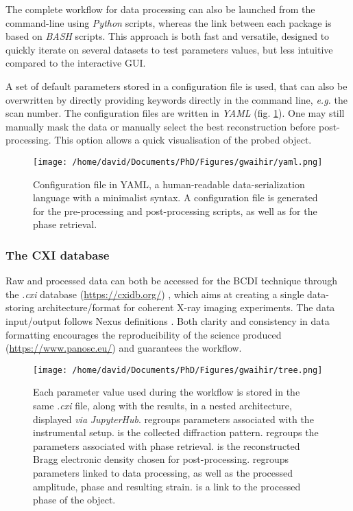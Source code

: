 The complete workflow for data processing can also be launched from the command-line using \textit{Python} scripts, whereas the link between each package is based on \textit{BASH} scripts.
This approach is both fast and versatile, designed to quickly iterate on several datasets to test parameters values, but less intuitive compared to the interactive GUI.

A set of default parameters stored in a configuration file is used, that can also be overwritten by directly providing keywords directly in the command line, \textit{e.g.} the scan number.
The configuration files are written in \textit{YAML} (fig. \ref{fig:YAML_file}).
One may still manually mask the data or manually select the best reconstruction before post-processing.
This option allows a quick visualisation of the probed object.

\begin{figure}[!htb]
    \centering
    \texttt{[image: /home/david/Documents/PhD/Figures/gwaihir/yaml.png]}
    \caption{
    Configuration file in YAML, a human-readable data-serialization language with a minimalist syntax.
    A configuration file is generated for the pre-processing and post-processing scripts, as well as for the phase retrieval.
    }
    \label{fig:YAML_file}
\end{figure}

\subsubsection{The CXI database}

Raw and processed data can both be accessed for the BCDI technique through the \textit{.cxi} database (\url{https://cxidb.org/}) \parencite{Maia2012}, which aims at creating a single data-storing architecture/format for coherent X-ray imaging experiments.
The data input/output follows Nexus definitions \parencite{Konnecke2015}.
Both clarity and consistency in data formatting encourages the reproducibility of the science produced (\url{https://www.panosc.eu/}) and guarantees the workflow.

\begin{figure}[!htb]
    \centering
    \texttt{[image: /home/david/Documents/PhD/Figures/gwaihir/tree.png]}
    \caption{
    Each parameter value used during the workflow is stored in the same \textit{.cxi} file, along with the results, in a nested architecture, displayed \textit{via} \textit{JupyterHub}.
     regroups parameters associated with the instrumental setup.
     is the collected diffraction pattern.
     regroups the parameters associated with phase retrieval.
     is the reconstructed Bragg electronic density chosen for post-processing.
     regroups parameters linked to data processing, as well as the processed amplitude, phase and resulting strain.
     is a link to the processed phase of the object.
    }
    \label{fig:TREE}
\end{figure}

